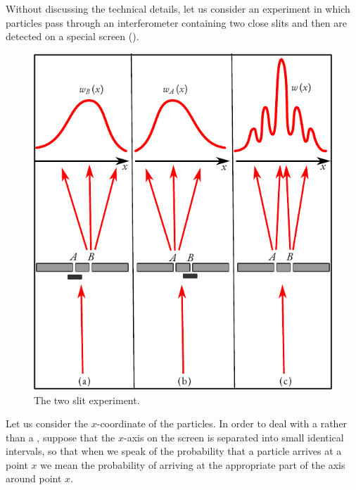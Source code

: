  Without discussing the technical details, let us consider an experiment in which particles pass through an interferometer containing two close slits and
then are detected on a special screen (). 

\begin{figure}[!ht]
\centering
\includegraphics[width=0.8\tfwidth]{figures/interference.pdf}
\caption{The two slit experiment.\label{double-slit}}
\end{figure}
Let us consider the $x$-coordinate of the particles. In order to deal with a  rather than a , suppose that the $x$-axis on the screen is separated into small identical intervals, so that when we speak of the probability that a particle arrives at a point $x$ we mean the probability of arriving at the appropriate part of the axis around point $x$.

